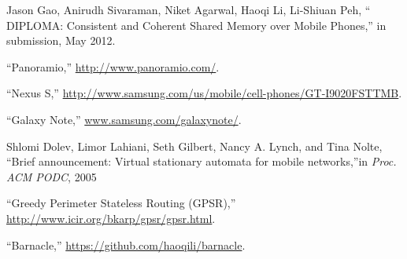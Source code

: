 %
%


\begin{thebibliography}{9}

Jason Gao, Anirudh Sivaraman, Niket Agarwal, Haoqi Li, Li-Shiuan Peh, \textquotedblleft 
DIPLOMA: Consistent and Coherent Shared Memory over Mobile Phones,\textquotedblright 
in submission, May 2012.

\textquotedblleft Panoramio,\textquotedblright 
{\url{http://www.panoramio.com/}}.

\textquotedblleft Nexus S,\textquotedblright 
{\url{http://www.samsung.com/us/mobile/cell-phones/GT-I9020FSTTMB}}.

\textquotedblleft Galaxy Note,\textquotedblright 
{\url{www.samsung.com/galaxynote/}}.

Shlomi Dolev, Limor Lahiani, Seth Gilbert, Nancy A. Lynch, and Tina Nolte, ``Brief announcement: Virtual stationary automata for mobile networks,\textquotedblright in \emph{Proc. ACM PODC}, 2005

\textquotedblleft Greedy Perimeter Stateless Routing (GPSR),\textquotedblright 
{\url{http://www.icir.org/bkarp/gpsr/gpsr.html}}.

\textquotedblleft Barnacle,\textquotedblright 
{\url{https://github.com/haoqili/barnacle}}.


\end{thebibliography}
